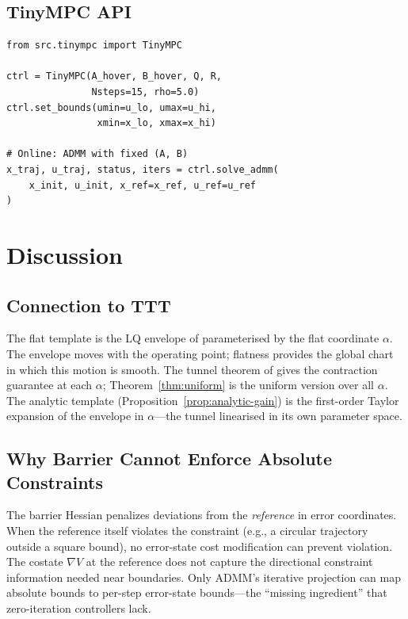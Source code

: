 \documentclass[11pt]{article}
\begin{document}
\subsection{TinyMPC API}

\begin{lstlisting}[caption={tinympc.py}]
from src.tinympc import TinyMPC

ctrl = TinyMPC(A_hover, B_hover, Q, R,
               Nsteps=15, rho=5.0)
ctrl.set_bounds(umin=u_lo, umax=u_hi,
                xmin=x_lo, xmax=x_hi)

# Online: ADMM with fixed (A, B)
x_traj, u_traj, status, iters = ctrl.solve_admm(
    x_init, u_init, x_ref=x_ref, u_ref=u_ref
)
\end{lstlisting}

\section{Discussion}\label{sec:discussion}

\subsection{Connection to TTT}

The flat template is the LQ envelope
of \cite{zhang2026ttt} parameterised by
the flat coordinate $\alpha$.
The envelope moves with the operating point;
flatness provides the global chart
in which this motion is smooth.
The tunnel theorem of \cite{zhang2026ttt}
gives the contraction guarantee at each $\alpha$;
Theorem~\ref{thm:uniform} is the uniform version
over all $\alpha$.
The analytic template
(Proposition~\ref{prop:analytic-gain})
is the first-order Taylor expansion of the
envelope in $\alpha$---the tunnel
linearised in its own parameter space.

\subsection{Why Barrier Cannot Enforce Absolute Constraints}

The barrier Hessian penalizes deviations from the
\emph{reference} in error coordinates.
When the reference itself violates the constraint
(e.g., a circular trajectory outside a square bound),
no error-state cost modification can prevent violation.
The costate $\nabla V$ at the reference does not capture
the directional constraint information needed near boundaries.
Only ADMM's iterative projection can map absolute bounds
to per-step error-state bounds---the ``missing ingredient''
that zero-iteration controllers lack.
\end{document}

